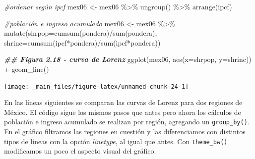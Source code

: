 \documentclass[
]{book}
\newenvironment{Shaded}{\begin{snugshade}}{\end{snugshade}}
\newcommand{\AttributeTok}[1]{\textcolor[rgb]{0.77,0.63,0.00}{#1}}
\newcommand{\CommentTok}[1]{\textcolor[rgb]{0.56,0.35,0.01}{\textit{#1}}}
\newcommand{\DocumentationTok}[1]{\textcolor[rgb]{0.56,0.35,0.01}{\textbf{\textit{#1}}}}
\newcommand{\FunctionTok}[1]{\textcolor[rgb]{0.00,0.00,0.00}{#1}}
\newcommand{\NormalTok}[1]{#1}
\newcommand{\OtherTok}[1]{\textcolor[rgb]{0.56,0.35,0.01}{#1}}
\newcommand{\SpecialCharTok}[1]{\textcolor[rgb]{0.00,0.00,0.00}{#1}}
\begin{document}
\begin{Shaded}
\begin{Highlighting}[]
\CommentTok{\#ordenar según ipcf}
\NormalTok{mex06 }\OtherTok{\textless{}{-}}\NormalTok{ mex06 }\SpecialCharTok{\%\textgreater{}\%} \FunctionTok{ungroup}\NormalTok{() }\SpecialCharTok{\%\textgreater{}\%} \FunctionTok{arrange}\NormalTok{(ipcf)}

\CommentTok{\#población e ingreso acumulado}
\NormalTok{mex06 }\OtherTok{\textless{}{-}}\NormalTok{ mex06 }\SpecialCharTok{\%\textgreater{}\%} \FunctionTok{mutate}\NormalTok{(}\AttributeTok{shrpop=}\FunctionTok{cumsum}\NormalTok{(pondera)}\SpecialCharTok{/}\FunctionTok{sum}\NormalTok{(pondera),}
                          \AttributeTok{shrinc=}\FunctionTok{cumsum}\NormalTok{(ipcf}\SpecialCharTok{*}\NormalTok{pondera)}\SpecialCharTok{/}\FunctionTok{sum}\NormalTok{(ipcf}\SpecialCharTok{*}\NormalTok{pondera)) }

\DocumentationTok{\#\# Figura 2.18 {-} curva de Lorenz }
\FunctionTok{ggplot}\NormalTok{(mex06, }\FunctionTok{aes}\NormalTok{(}\AttributeTok{x=}\NormalTok{shrpop, }\AttributeTok{y=}\NormalTok{shrinc)) }\SpecialCharTok{+}
  \FunctionTok{geom\_line}\NormalTok{()}
\end{Highlighting}
\end{Shaded}

\texttt{[image: \_main\_files/figure-latex/unnamed-chunk-24-1]}

En las líneas siguientes se comparan las curvas de Lorenz para dos regiones de México. El código sigue los mismos pasos que antes pero ahora los cálculos de población e ingreso acumulado se realizan por región, agregando un \texttt{group\_by()}. En el gráfico filtramos las regiones en cuestión y las diferenciamos con distintos tipos de líneas con la opción \emph{linetype}, al igual que antes. Con \texttt{theme\_bw()} modificamos un poco el aspecto visual del gráfico.
\end{document}
